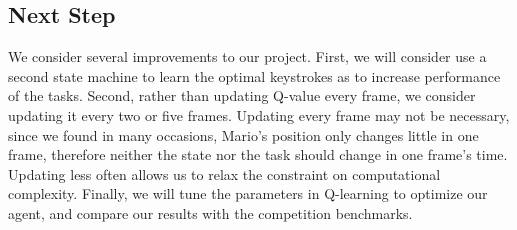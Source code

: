 \subsection{Next Step}
We consider several improvements to our project. First, we will consider use a second state machine to learn the optimal keystrokes as to increase performance of the tasks. Second, rather than updating Q-value every frame, we consider updating it every two or five frames. Updating every frame may not be necessary, since we found in many occasions, Mario's position only changes little in one frame, therefore neither the state nor the task should change in one frame's time. Updating less often allows us to relax the constraint on computational complexity.
Finally, we will tune the parameters in Q-learning to optimize our agent, and compare our results with the competition benchmarks.


\newpage









%
